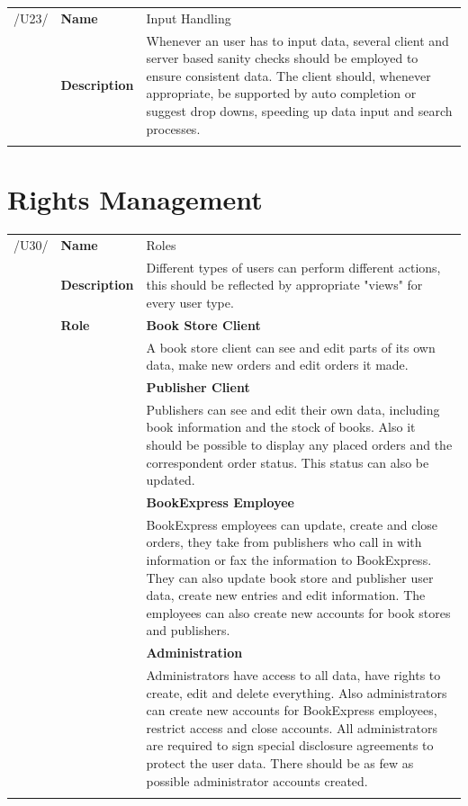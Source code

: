\documentclass[11pt,a4paper,oneside,svgnames]{report}
\begin{document}
\noindent
\begin{tabular}{llp{8.75cm}}
\cellcolor{white}/U23/	& \textbf{Name}			& Input Handling\\
\cellcolor{white}		& \textbf{Description}	& Whenever an user has to input data, several client and server based sanity checks should be employed to ensure consistent data. The client should, whenever appropriate, be supported by auto completion or suggest drop downs, speeding up data input and search processes.\\
\cellcolor{white}		\hfill \\
\end{tabular}

\section{Rights Management}
\label{sec:rights-management}

\noindent
\begin{tabular}{llp{8.75cm}}
\cellcolor{white}/U30/	& \textbf{Name}			& Roles\\
\cellcolor{white}		& \textbf{Description}	& Different types of users can perform different actions, this should be reflected by appropriate "views" for every user type.\\
\cellcolor{white}		& \textbf{Role}			& \textbf{Book Store Client}\\
\cellcolor{white}		&						& A book store client can see and edit parts of its own data, make new orders and edit orders it made.\\
\cellcolor{white}		&						& \textbf{Publisher Client}\\
\cellcolor{white}		&						& Publishers can see and edit their own data, including book information and the stock of books. Also it should be possible to display any placed orders and the correspondent order status. This status can also be updated.\\
\cellcolor{white}		&						& \textbf{BookExpress Employee}\\
\cellcolor{white}		&						& BookExpress employees can update, create and close orders, they take from publishers who call in with information or fax the information to BookExpress. They can also update book store and publisher user data, create new entries and edit information. The employees can also create new accounts for book stores and publishers.\\
\cellcolor{white}		&						& \textbf{Administration}\\
\cellcolor{white}		&						& Administrators have access to all data, have rights to create, edit and delete everything. Also administrators can create new accounts for BookExpress employees, restrict access and close accounts. All administrators are required to sign special disclosure agreements to protect the user data. There should be as few as possible administrator accounts created.\\
\cellcolor{white}		\hfill \\
\end{tabular}
\end{document}

